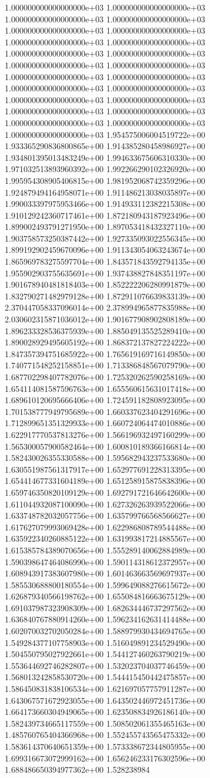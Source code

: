 1.000000000000000000e+03	1.000000000000000000e+03	1.000000000000000000e+03	1.000000000000000000e+03	1.000000000000000000e+03	1.000000000000000000e+03	1.000000000000000000e+03	1.000000000000000000e+03	1.000000000000000000e+03	1.000000000000000000e+03	1.000000000000000000e+03	1.000000000000000000e+03	1.000000000000000000e+03	1.000000000000000000e+03	1.000000000000000000e+03	1.000000000000000000e+03	1.000000000000000000e+03	1.000000000000000000e+03	1.000000000000000000e+03	1.000000000000000000e+03	1.000000000000000000e+03	1.000000000000000000e+03	1.000000000000000000e+03	1.954575006004519722e+00	1.933365290836800865e+00	1.914385280458986927e+00	1.934801395013483249e+00	1.994633675606310330e+00	1.971032513893960392e+00	1.992266290102326920e+00	1.995954308905406815e+00	1.981952068742359296e+00	1.924879494164958071e+00	1.911486213038035897e+00	1.990033397975953466e+00	1.914933112382215308e+00	1.910129242360717461e+00	1.872180943187923496e+00	1.899002493791271950e+00	1.897053418432327110e+00	1.903758573250387442e+00	1.927335093022556345e+00	1.899192902459670096e+00	1.911343054063243674e+00	1.865969783275597704e+00	1.843571843592794135e+00	1.955902903755635691e+00	1.937438827848351197e+00	1.901678940481818403e+00	1.852222206280991879e+00	1.832790271482979128e+00	1.872911076639833139e+00	2.370447058337096014e+00	2.378994965877835988e+00	2.030602315871036012e+00	1.901677908902808189e+00	1.896233328536375939e+00	1.885049135525289410e+00	1.890028929495605192e+00	1.868372137827224222e+00	1.847357394751685922e+00	1.765619169716149850e+00	1.740771548252158851e+00	1.713386848567079790e+00	1.687702298407782076e+00	1.725320262590258169e+00	1.654114081587596763e+00	1.655560615631017418e+00	1.689610120695666406e+00	1.724591182808923095e+00	1.701538777949795689e+00	1.660337623404291696e+00	1.712899651351329933e+00	1.660724064474010886e+00	1.622917770537813276e+00	1.566196932497160299e+00	1.565300057900582464e+00	1.600810189366166814e+00	1.582430026355330588e+00	1.595682943237533680e+00	1.630551987561317917e+00	1.652977691228313395e+00	1.654414677331604189e+00	1.651258915875838396e+00	1.659746350820109129e+00	1.692791721646642600e+00	1.611044932087100090e+00	1.627326263939522066e+00	1.633748782032057756e+00	1.635799766568566627e+00	1.617627079993069428e+00	1.622986808789544488e+00	1.635922340260885122e+00	1.631993817214885567e+00	1.615385784389070656e+00	1.555289140062884989e+00	1.590398647464086990e+00	1.590114318612372957e+00	1.608943917383607980e+00	1.601463663569697937e+00	1.585530688800180554e+00	1.599649088276615672e+00	1.626879340566198762e+00	1.655084816663675129e+00	1.691037987323908309e+00	1.682634446737297562e+00	1.636840767880914260e+00	1.596234162631414488e+00	1.602070032702050284e+00	1.588979930434694765e+00	1.549284377107758903e+00	1.516049891234529490e+00	1.504550795027922661e+00	1.544127460263790219e+00	1.553644692746282807e+00	1.532023704037746459e+00	1.568013242858530720e+00	1.544415450442475857e+00	1.586450831838106534e+00	1.621697057757911287e+00	1.643067571672923055e+00	1.643502446972451736e+00	1.664173660304949065e+00	1.623508834926186140e+00	1.582439734665117559e+00	1.508502061355465163e+00	1.485760765404366968e+00	1.552455743565475332e+00	1.583614370640651359e+00	1.573338672344805955e+00	1.699316673072999162e+00	1.656246233176302596e+00	1.688486650394977362e+00	1.528238984